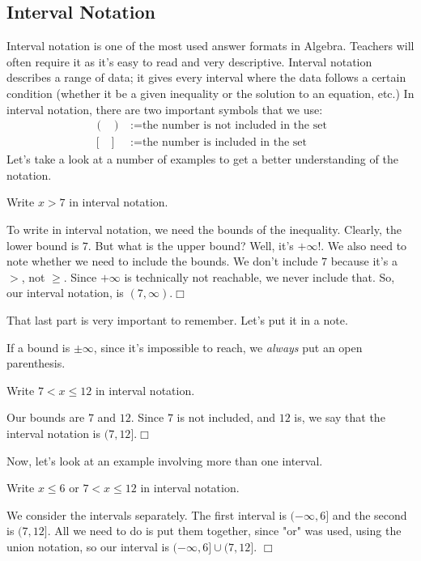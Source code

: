 \documentclass[lang=en,11pt]{elegantbook}
\begin{document}
\subsection{Interval Notation}
\noindent Interval notation is one of the most used answer formats in Algebra.  Teachers will often require it as it's easy to read and very descriptive.  Interval notation describes a range of data; it gives every interval where the data follows a certain condition (whether it be a given inequality or the solution to an equation, etc.) In interval notation, there are two important symbols that we use:  \begin{align*}
    (\text{ }) &:= \text{the number is not included in the set} \\
    [\text{ }] &:= \text{the number is included in the set}
\end{align*}
Let's take a look at a number of examples to get a better understanding of the notation.
\begin{example}
Write $x>7$ in interval notation.
\end{example}
\begin{solution}
To write in interval notation, we need the bounds of the inequality.  Clearly, the lower bound is $7$.  But what is the upper bound?  Well, it's $+\infty$!.  We also need to note whether we need to include the bounds.  We don't include $7$ because it's a $>$, not $\geq$.  Since $+\infty$ is technically not reachable, we never include that.  So, our interval notation, is $(7,\infty)$.$\Box$
\end{solution}
\noindent That last part is very important to remember.  Let's put it in a note.
\begin{note}
If a bound is $\pm\infty$, since it's impossible to reach, we \textit{always} put an open parenthesis.
\end{note}
\begin{example}
Write $7<x\leq 12$ in interval notation.
\end{example}
\begin{solution}
Our bounds are $7$ and $12$.  Since $7$ is not included, and $12$ is, we say that the interval notation is $(7,12]$.$\Box$
\end{solution}
\noindent Now, let's look at an example involving more than one interval.
\begin{example}
Write $x \leq 6$ or $7<x\leq 12$ in interval notation.  
\end{example}
\begin{solution}
We consider the intervals separately.  The first interval is $(-\infty,6]$ and the second is $(7,12]$.  All we need to do is put them together, since "or" was used, using the union notation, so our interval is $(-\infty,6]\cup(7,12]$.  $\Box$
\end{solution}
\end{document}
